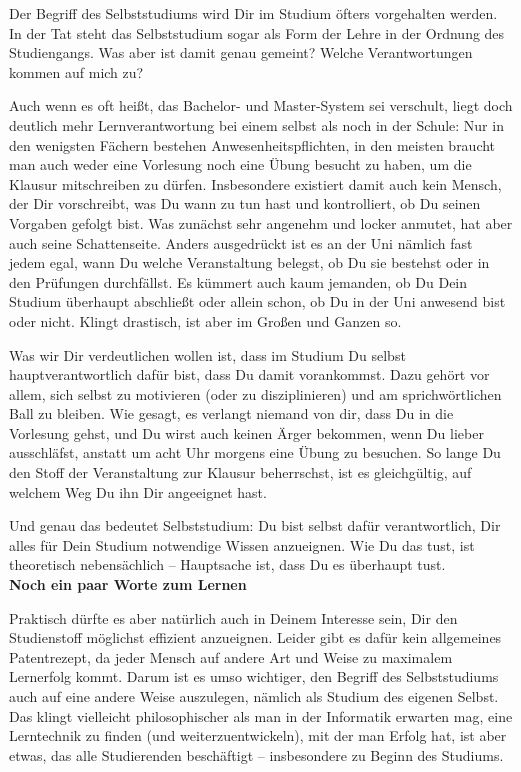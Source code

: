 {Der Begriff des Selbststudiums wird Dir im Studium öfters vorgehalten werden. In der Tat steht das Selbststudium sogar als Form der Lehre in der Ordnung des Studiengangs. Was aber ist damit genau gemeint? Welche Verantwortungen kommen auf mich zu?
}{Auch wenn es oft heißt, das Bachelor- und Master-System sei verschult, liegt doch deutlich mehr Lernverantwortung bei einem selbst als noch in der Schule: Nur in den wenigsten Fächern bestehen Anwesenheitspflichten, in den meisten braucht man auch weder eine Vorlesung noch eine Übung besucht zu haben, um die Klausur mitschreiben zu dürfen. Insbesondere existiert damit auch kein Mensch, der Dir vorschreibt, was Du wann zu tun hast und kontrolliert, ob Du seinen Vorgaben gefolgt bist.
Was zunächst sehr angenehm und locker anmutet, hat aber auch seine Schattenseite. Anders ausgedrückt ist es an der Uni nämlich fast jedem egal, wann Du welche Veranstaltung belegst, ob Du sie bestehst oder in den Prüfungen durchfällst. Es kümmert auch kaum jemanden, ob Du Dein Studium überhaupt abschließt oder allein schon, ob Du in der Uni anwesend bist oder nicht. Klingt drastisch, ist aber im Großen und Ganzen so.

Was wir Dir verdeutlichen wollen ist, dass im Studium Du selbst hauptverantwortlich dafür bist, dass Du damit vorankommst. Dazu gehört vor allem, sich selbst zu motivieren (oder zu disziplinieren) und am sprichwörtlichen Ball zu bleiben. Wie gesagt, es verlangt niemand von dir, dass Du in die Vorlesung gehst, und Du wirst auch keinen Ärger bekommen, wenn Du lieber ausschläfst, anstatt um acht Uhr morgens eine Übung zu besuchen. So lange Du den Stoff der Veranstaltung zur Klausur beherrschst, ist es gleichgültig, auf welchem Weg Du ihn Dir angeeignet hast.

Und genau das bedeutet Selbststudium: Du bist selbst dafür verantwortlich, Dir alles für Dein Studium notwendige Wissen anzueignen. Wie Du das tust, ist theoretisch nebensächlich – Hauptsache ist, dass Du es überhaupt tust.\\

\textbf{Noch ein paar Worte zum Lernen}

Praktisch dürfte es aber natürlich auch in Deinem Interesse sein, Dir den Studienstoff möglichst effizient anzueignen. Leider gibt es dafür kein allgemeines Patentrezept, da jeder Mensch auf andere Art und Weise zu maximalem Lernerfolg kommt. Darum ist es umso wichtiger, den Begriff des Selbststudiums auch auf eine andere Weise auszulegen, nämlich als Studium des eigenen Selbst. Das klingt vielleicht philosophischer als man in der Informatik erwarten mag, eine Lerntechnik zu finden (und weiterzuentwickeln), mit der man Erfolg hat, ist aber etwas, das alle Studierenden beschäftigt – insbesondere zu Beginn des Studiums.

}
